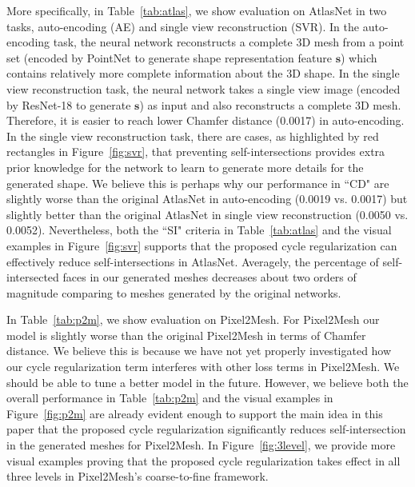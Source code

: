 More specifically, in Table~\ref{tab:atlas}, we show evaluation on AtlasNet in two tasks, auto-encoding (AE) and single view reconstruction (SVR). In the auto-encoding task, the neural network reconstructs a complete 3D mesh from a point set (encoded by PointNet \cite{pointnet} to generate shape representation feature $\mathbf{s}$) which contains relatively more complete information about the 3D shape. In the single view reconstruction task, the neural network takes a single view image (encoded by ResNet-18 \cite{resnet} to generate $\mathbf{s}$) as input and also reconstructs a complete 3D mesh. Therefore, it is easier to reach lower Chamfer distance (0.0017) in auto-encoding. In the single view reconstruction task, there are cases, as highlighted by red rectangles in Figure~\ref{fig:svr}, that preventing self-intersections provides extra prior knowledge for the network to learn to generate more details for the generated shape. We believe this is perhaps why our performance in ``CD"  are slightly worse than the original AtlasNet in auto-encoding (0.0019 vs. 0.0017) but slightly better than the original AtlasNet in single view reconstruction (0.0050 vs. 0.0052). Nevertheless, both the ``SI" criteria in Table~\ref{tab:atlas} and the visual examples in Figure~\ref{fig:svr} supports that the proposed cycle regularization can effectively reduce self-intersections in AtlasNet. Averagely, the percentage of self-intersected faces in our generated meshes decreases about two orders of magnitude comparing to meshes generated by the original networks.

In Table~\ref{tab:p2m}, we show evaluation on Pixel2Mesh. For Pixel2Mesh our model is slightly worse than the original Pixel2Mesh in terms of Chamfer distance. We believe this is because we have not yet properly investigated how our cycle regularization term interferes with other loss terms in Pixel2Mesh. We should be able to tune a better model in the future. However, we believe both the overall performance in Table~\ref{tab:p2m} and the visual examples in Figure~\ref{fig:p2m} are already evident enough to support the main idea in this paper that the proposed cycle regularization significantly reduces self-intersection in the generated meshes for Pixel2Mesh. In Figure~\ref{fig:3level}, we provide more visual examples proving that the proposed cycle regularization takes effect in all three levels in Pixel2Mesh's coarse-to-fine framework.

